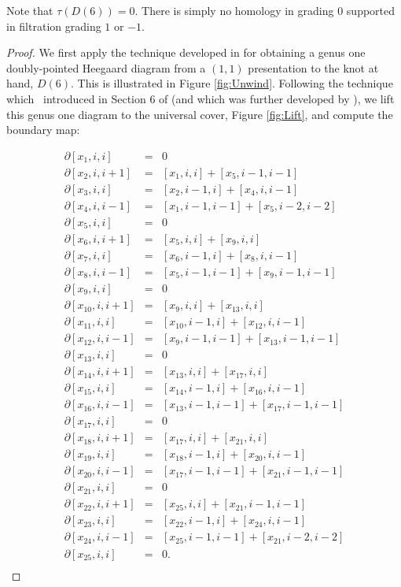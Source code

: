  Note that $\tau(D(6))=0$. There is simply no homology in grading $0$ supported in filtration grading $1$ or $-1$.

\begin{proof}
	We first apply the technique developed in \cite{Goda} for obtaining a genus one doubly-pointed Heegaard diagram from a $(1,1)$ presentation to the knot at hand, $D(6)$.  This is illustrated in Figure \ref{fig:Unwind}.  Following the technique which \ons \ introduced in Section $6$ of \cite{Knots} (and which was further developed by \cite{Goda}), we lift this genus one diagram to the universal cover, Figure \ref{fig:Lift}, and compute the boundary map:

\begin{eqnarray*}
\partial[x_1,i,i]&=&0 \\
\partial[x_2,i,i+1]&=&[x_1,i,i]+[x_5,i-1,i-1] \\
\partial[x_3,i,i]&=& [x_2,i-1,i]+[x_4,i,i-1] \\
\partial[x_4,i,i-1]&=& [x_1,i-1,i-1]+[x_5,i-2,i-2] \\
\partial[x_5,i,i]&=& 0 \\
\partial[x_6,i,i+1]&=&[x_5,i,i] +[x_9,i,i]\\
\partial[x_7,i,i]&=& [x_6,i-1,i]+[x_8,i,i-1] \\
\partial[x_8,i,i-1]&=&[x_5,i-1,i-1]+[x_9,i-1,i-1] \\
\partial[x_9,i,i] &=& 0 \\
\partial[x_{10},i,i+1]&=&[x_9,i,i] +[x_{13},i,i]\\
\partial[x_{11},i,i]&=& [x_{10},i-1,i]+[x_{12},i,i-1] \\
\partial[x_{12},i,i-1]&=&[x_9,i-1,i-1]+[x_{13},i-1,i-1] \\
\partial[x_{13},i,i] &=& 0 \\
\partial[x_{14},i,i+1]&=&[x_{13},i,i] +[x_{17},i,i]\\
\partial[x_{15},i,i]&=& [x_{14},i-1,i]+[x_{16},i,i-1] \\
\partial[x_{16},i,i-1]&=&[x_{13},i-1,i-1]+[x_{17},i-1,i-1] \\
\partial[x_{17},i,i] &=& 0 \\
\partial[x_{18},i,i+1]&=&[x_{17},i,i] +[x_{21},i,i]\\
\partial[x_{19},i,i]&=& [x_{18},i-1,i]+[x_{20},i,i-1] \\
\partial[x_{20},i,i-1]&=&[x_{17},i-1,i-1]+[x_{21},i-1,i-1] \\
\partial[x_{21},i,i]&=&0 \\
\partial[x_{22},i,i+1]&=&[x_{25},i,i]+[x_{21},i-1,i-1] \\
\partial[x_{23},i,i]&=& [x_{22},i-1,i]+[x_{24},i,i-1] \\
\partial[x_{24},i,i-1]&=& [x_{25},i-1,i-1]+[x_{21},i-2,i-2] \\
\partial[x_{25},i,i]&=& 0. \\
\end{eqnarray*}



\end{proof}
